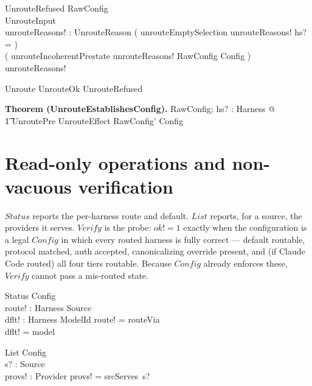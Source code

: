 \documentclass{article}
\makeatletter
\newenvironment{theorem}[1]{\medskip\noindent\textbf{Theorem (#1).}\@nameuse{zed}}{\@nameuse{endzed}}
\makeatother
\begin{document}
\begin{schema}{UnrouteRefused}
	\Xi RawConfig \\
	UnrouteInput \\
	unrouteReasons! : \power UnrouteReason
	\where
	( unrouteEmptySelection \in unrouteReasons! \iff hs? = \emptyset ) \\
	( unrouteIncoherentPrestate \in unrouteReasons! \iff
	\theta RawConfig \notin Config ) \\
	unrouteReasons! \neq \emptyset
\end{schema}

\begin{zed}
	Unroute  UnrouteOk \lor UnrouteRefused
\end{zed}

\begin{theorem}{UnrouteEstablishesConfig}
	\forall \Delta RawConfig; hs? : \power Harness @ \\
	\t1 UnroutePre \land UnrouteEffect \implies \theta RawConfig' \in Config
\end{theorem}

\section{Read-only operations and non-vacuous verification}

$Status$ reports the per-harness route and default. $List$ reports, for a source,
the providers it serves. $Verify$ is the probe: $ok! = 1$ exactly when the
configuration is a legal $Config$ in which every routed harness is fully correct
--- default routable, protocol matched, auth accepted, canonicalizing override
present, and (if Claude Code routed) all four tiers routable. Because $Config$
already enforces these, $Verify$ cannot pass a mis-routed state.

\begin{schema}{Status}
	\Xi Config \\
	route! : Harness \pfun Source \\
	dflt! : Harness \pfun ModelId
	\where
	route! = routeVia \\
	dflt! = model
\end{schema}

\begin{schema}{List}
	\Xi Config \\
	s? : Source \\
	provs! : \power Provider
	\where
	provs! = srcServes~s?
\end{schema}
\end{document}
